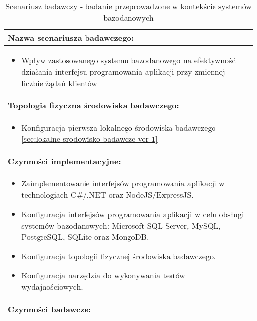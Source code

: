 \setlength{\LTcapwidth}{\textwidth}
\setlength\LTleft{0pt}
\setlength\LTright{0pt}
\begin{longtable}[c]{|llll|}
    \caption{Scenariusz badawczy - badanie przeprowadzone w kontekście systemów bazodanowych}
    \label{tab:research-scenario-1}                                                  \\ \hline
    \multicolumn{4}{|l|}{\textbf{Nazwa scenariusza badawczego:}}                     \\ \hline
    \multicolumn{4}{|p{\linewidth}|}{
        \begin{itemize}[label={}]
            \item Wpływ zastosowanego systemu bazodanowego na efektywność działania interfejsu programowania aplikacji przy zmiennej liczbie żądań klientów
          \end{itemize}
    } \\ \hline
    \multicolumn{4}{|l|}{\textbf{Topologia fizyczna środowiska badawczego:}}         \\ \hline
    \multicolumn{4}{|p{\linewidth}|}{
        \begin{itemize}[label={}]
            \item Konfiguracja pierwsza lokalnego środowiska badawczego \ref{sec:lokalne-srodowisko-badawcze-ver-1}
          \end{itemize}
    }\\ \hline
    \multicolumn{4}{|l|}{\textbf{Czynności implementacyjne:}}                        \\ \hline
    \multicolumn{4}{|p{\linewidth}|}{
        \begin{itemize}
            \item Zaimplementowanie interfejsów programowania aplikacji w technologiach C\#/.NET oraz NodeJS/ExpressJS.
            \item Konfiguracja interfejsów programowania aplikacji w celu obsługi systemów bazodanowych: Microsoft SQL Server, MySQL, PostgreSQL, SQLite oraz MongoDB.
            \item Konfiguracja topologii fizycznej środowiska badawczego.
            \item Konfiguracja narzędzia do wykonywania testów wydajnościowych.
        \end{itemize}}                                                           \\ \hline
    \multicolumn{4}{|l|}{\textbf{Czynności badawcze:}}                               \\ \hline

\end{longtable}
